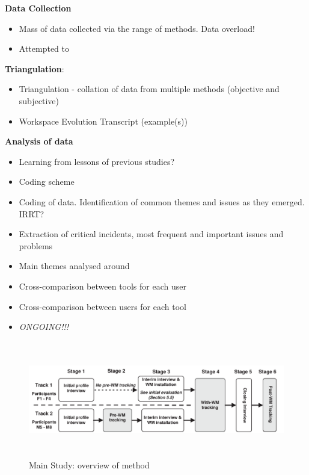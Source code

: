 \textbf{Data Collection}
\begin{itemize}
	\item Mass of data collected via the range of methods. Data overload!
	\item Attempted to
\end{itemize}

\textbf{Triangulation}:
\begin{itemize}
	\item Triangulation - collation of data from multiple methods (objective and subjective)
	\item Workspace Evolution Transcript (example(s))
\end{itemize}

\textbf{Analysis of data}
\begin{itemize}
		\item Learning from lessons of previous studies?
		\item Coding scheme
		\item Coding of data. Identification of common themes and issues as they emerged. IRRT?
		\item Extraction of critical incidents, most frequent and important issues and problems
		\item Main themes analysed around
		\item Cross-comparison between tools for each user
		\item Cross-comparison between users for each tool
		\item \textit{ONGOING!!!}
\end{itemize}





\begin{figure}[t]
	\begin{center}
		\leavevmode
		\includegraphics[height=2in, width=.9 \textwidth]{pictures/main-study/main-study-method.pdf}
	\end{center}
	\caption{Main Study: overview of method}
	\label{fig:main-study:method-overview}
\end{figure}




